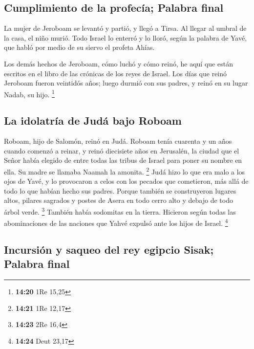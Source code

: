 \begin{paracol}{2}
\hypertarget{cumplimiento-de-la-profecuxeda-palabra-final}{%
\subsection{Cumplimiento de la profecía; Palabra
final}\label{cumplimiento-de-la-profecuxeda-palabra-final}}

 La mujer de Jeroboam se levantó y partió, y llegó a
Tirsa. Al llegar al umbral de la casa, el niño murió. 
Todo Israel lo enterró y lo lloró, según la palabra de Yavé, que habló
por medio de su siervo el profeta Ahías.

 Los demás hechos de Jeroboam, cómo luchó y cómo reinó,
he aquí que están escritos en el libro de las crónicas de los reyes de
Israel.  Los días que reinó Jeroboam fueron veintidós
años; luego durmió con sus padres, y reinó en su lugar Nadab, su hijo.
\footnote{\textbf{14:20} 1Re 15,25}

\hypertarget{la-idolatruxeda-de-juduxe1-bajo-roboam}{%
\subsection{La idolatría de Judá bajo
Roboam}\label{la-idolatruxeda-de-juduxe1-bajo-roboam}}

 Roboam, hijo de Salomón, reinó en Judá. Roboam tenía
cuarenta y un años cuando comenzó a reinar, y reinó diecisiete años en
Jerusalén, la ciudad que el Señor había elegido de entre todas las
tribus de Israel para poner su nombre en ella. Su madre se llamaba
Naamah la amonita. \footnote{\textbf{14:21} 1Re 12,17} 
Judá hizo lo que era malo a los ojos de Yavé, y lo provocaron a celos
con los pecados que cometieron, más allá de todo lo que habían hecho sus
padres.  Porque también se construyeron lugares altos,
pilares sagrados y postes de Asera en todo cerro alto y debajo de todo
árbol verde. \footnote{\textbf{14:23} 2Re 16,4}  También
había sodomitas en la tierra. Hicieron según todas las abominaciones de
las naciones que Yahvé expulsó ante los hijos de Israel. \footnote{\textbf{14:24}
  Deut 23,17}

\hypertarget{incursiuxf3n-y-saqueo-del-rey-egipcio-sisak-palabra-final}{%
\subsection{Incursión y saqueo del rey egipcio Sisak; Palabra
final}\label{incursiuxf3n-y-saqueo-del-rey-egipcio-sisak-palabra-final}}


\end{paracol}
